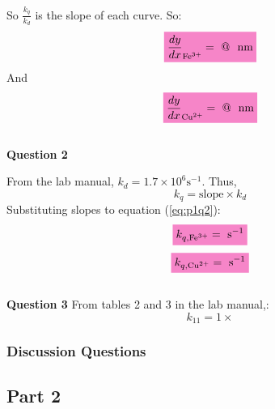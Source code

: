 \documentclass[main.tex]{subfiles}
\begin{document}
So $\frac{k_q}{k_d}$ is the slope of each curve. So:
\begin{equation*}
    \mathcolorbox{Lavender}{\frac{dy}{dx}_{\text{Fe}^{3+}} =  \text{ @ }  \text{ nm} }
\end{equation*}
And
\begin{equation*}
    \mathcolorbox{Lavender}{\frac{dy}{dx}_{\text{Cu}^{2+}} =  \text{ @ }  \text{ nm} }
\end{equation*}
\\
\textbf{Question 2}
\par From the lab manual\autocite{lab_manual}, $k_d = 1.7 \times 10^6\text {s}^{-1}$. Thus,
\begin{equation}
    k_q = \text{slope} \times k_d
    \label{eq:p1q2}
\end{equation}
Substituting slopes to equation (\ref{eq:p1q2}):
\begin{equation*}
    \mathcolorbox{Lavender}{k_{q,\text{Fe}^{3+}} =  \text{ s}^{-1}}
\end{equation*}
\begin{equation*}
    \mathcolorbox{Lavender}{k_{q,\text{Cu}^{2+}} =  \text{ s}^{-1}}
\end{equation*}
\\
\textbf{Question 3}
From tables 2 and 3 in the lab manual,:
\begin{equation*}
    k_{11} = 1 \times 
\end{equation*}


\subsubsection*{Discussion Questions}

\subsection{Part 2}
\end{document}
